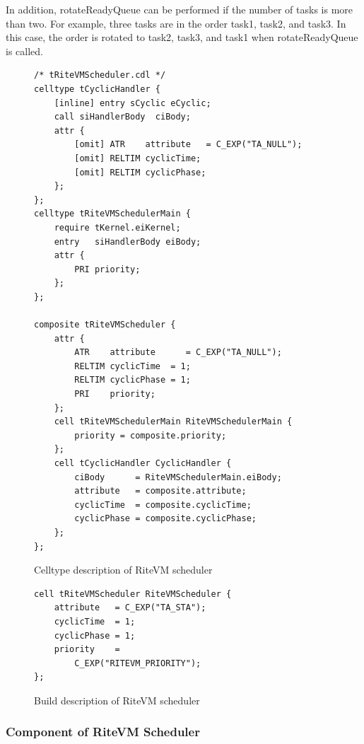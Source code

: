 \documentclass{sig-alternate-05-2015}
\begin{document}
In addition, {\myit rotateReadyQueue} can be performed if the number of tasks is more than two.
For example, three tasks are in the order task1, task2, and task3.
In this case, the order is rotated to task2, task3, and task1 when {\myit rotateReadyQueue} is called.

\begin{figure}[t]
    \centering
    \begin{lstlisting}
/* tRiteVMScheduler.cdl */
celltype tCyclicHandler {
    [inline] entry sCyclic eCyclic;
    call siHandlerBody  ciBody;
    attr {
        [omit] ATR    attribute   = C_EXP("TA_NULL");
    	[omit] RELTIM cyclicTime;
    	[omit] RELTIM cyclicPhase;
    };
};
celltype tRiteVMSchedulerMain {
    require tKernel.eiKernel;
    entry   siHandlerBody eiBody;
    attr {
        PRI priority;
    };
};

composite tRiteVMScheduler {
    attr {
        ATR    attribute      = C_EXP("TA_NULL");
        RELTIM cyclicTime  = 1;
        RELTIM cyclicPhase = 1;
        PRI    priority;
    };
    cell tRiteVMSchedulerMain RiteVMSchedulerMain {
        priority = composite.priority;
    };
    cell tCyclicHandler CyclicHandler {
        ciBody      = RiteVMSchedulerMain.eiBody;
        attribute   = composite.attribute;
        cyclicTime  = composite.cyclicTime;
        cyclicPhase = composite.cyclicPhase;
    };
};
    \end{lstlisting}
    \vspace{1mm}
\caption{Celltype description of RiteVM scheduler}
    \vspace{1mm}
\label{celltype_cyclic_handler}
\end{figure}
\begin{figure}[t]
    \centering
    \begin{lstlisting}
cell tRiteVMScheduler RiteVMScheduler {
    attribute   = C_EXP("TA_STA");
    cyclicTime  = 1;
    cyclicPhase = 1;
    priority    =
        C_EXP("RITEVM_PRIORITY");
};
\end{lstlisting}
    \vspace{1mm}
\caption{Build description of RiteVM scheduler}
    \vspace{1mm}
\label{build_cyclic_handler}
\end{figure}

\subsubsection{Component of RiteVM Scheduler}
\end{document}
